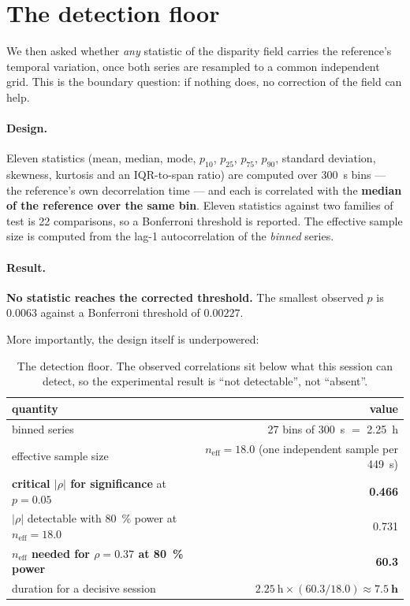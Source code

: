 \documentclass[11pt,a4paper]{article}
\newcommand{\neff}{\ensuremath{n_{\mathrm{eff}}}}
\newcommand{\rhoS}{\ensuremath{\rho}}
\begin{document}
\section{The detection floor}
\label{sec:floor}

We then asked whether \emph{any} statistic of the disparity field carries the reference's
temporal variation, once both series are resampled to a common independent grid. This is the
boundary question: if nothing does, no correction of the field can help.

\paragraph{Design.} Eleven statistics (mean, median, mode, $p_{10}$, $p_{25}$, $p_{75}$,
$p_{90}$, standard deviation, skewness, kurtosis and an IQR-to-span ratio) are computed over
\SI{300}{\second} bins --- the reference's own decorrelation time --- and each is correlated
with the \textbf{median of the reference over the same bin}. Eleven statistics against two
families of test is 22 comparisons, so a Bonferroni threshold is reported. The effective sample
size is computed from the lag-1 autocorrelation of the \emph{binned} series.

\paragraph{Result.} \textbf{No statistic reaches the corrected threshold.} The smallest
observed $p$ is $0.0063$ against a Bonferroni threshold of $0.00227$.

More importantly, the design itself is underpowered:

\begin{table}[t]
\centering
\caption{The detection floor. The observed correlations sit below what this session can
detect, so the experimental result is ``not detectable'', not ``absent''.}
\label{tab:floor}
\small
\begin{tabular}{@{}lr@{}}
\toprule
quantity & value \\
\midrule
binned series & 27 bins of \SI{300}{\second} $=$ \SI{2.25}{\hour} \\
effective sample size & $\neff = \mathbf{18.0}$ (one independent sample per \SI{449}{\second}) \\
\textbf{critical $|\rhoS|$ for significance} at $p = 0.05$ & \textbf{0.466} \\
$|\rhoS|$ detectable with \SI{80}{\percent} power at $\neff = 18.0$ & 0.731 \\
\textbf{$\neff$ needed for $\rhoS = 0.37$ at \SI{80}{\percent} power} & \textbf{60.3} \\
duration for a decisive session & $2.25~\text{h} \times (60.3/18.0) \approx \mathbf{7.5~\text{h}}$ \\
\bottomrule
\end{tabular}
\end{table}
\end{document}
